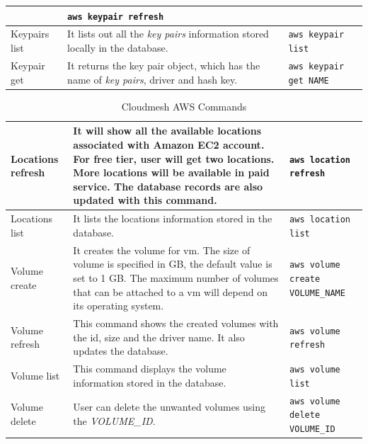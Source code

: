\documentclass[9pt,twocolumn,twoside]{../../styles/osajnl}
\begin{document}
\begin{table}[htb]
\begin{center}
\begin{tabular}{p{2cm}p{10cm}p{5cm}}
                         & \verb+aws keypair refresh+ \\
  \hline
  Keypairs list & It lists out all the \textit{key pairs} information stored locally in the database.
                         & \verb+aws keypair list+ \\
  \hline
  Keypair get & It returns the key pair object, which has the name of \textit{key pairs}, driver and hash key.
                         & \verb+aws keypair get NAME+ \\
  \hline
\end{tabular}
\end{center}
\end{table}


\begin{table}[htb]
\caption{Cloudmesh AWS Commands}\label{T:aws-commands} 
\begin{center}
\begin{tabular}{p{2cm}p{10cm}p{5cm}}
  Locations refresh & It will show all the available locations associated with Amazon EC2 account. For free tier, user will get two locations. More locations will be available in paid service. The database records are also updated with this command.
                         & \verb+aws location refresh+ \\
  \hline
  Locations list & It lists the locations information stored in the database.
                         & \verb+aws location list+ \\
  \hline
  Volume create & It creates the volume for vm. The size of volume is specified in GB, the default value is set to 1 GB. The maximum number of volumes that can be attached to a vm will depend on its operating system.
                         & \verb+aws volume create VOLUME_NAME+ \\
  \hline
  Volume refresh & This command shows the created volumes with the id, size and the driver name. It also updates the database.
                         & \verb+aws volume refresh+ \\
  \hline
  Volume list & This command displays the volume information stored in the database.
                         & \verb+aws volume list+ \\
  \hline
  Volume delete & User can delete the unwanted volumes using the \textit{VOLUME\_ID}.
                         & \verb+aws volume delete VOLUME_ID+ \\
\end{tabular}
\end{center}
\end{table}
\end{document}
